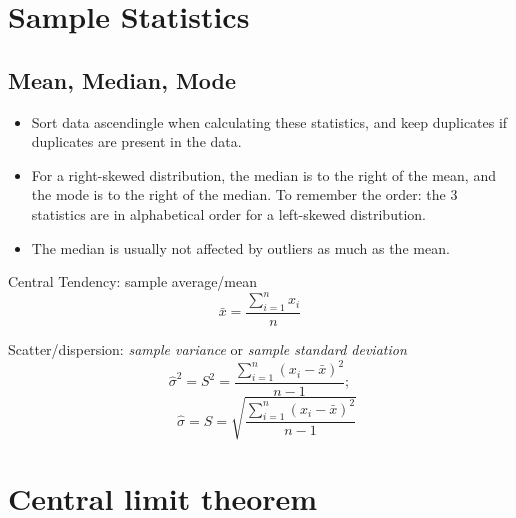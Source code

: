 \documentclass[a4paper,11pt]{book}
\begin{document}
\section*{Sample Statistics}

\subsection*{Mean, Median, Mode}
\begin{itemize}
\item Sort data ascendingle when calculating these statistics, and keep duplicates if duplicates are present in the data.
\item For a right-skewed distribution, the median is to the right of the mean, and the mode is to the right of the median. To remember the order: the 3 statistics are in alphabetical order for a left-skewed distribution.
\item The median is usually not affected by outliers as much as the mean.
\end{itemize}

Central Tendency: sample average/mean 
$$\bar{x}=\frac{\sum\limits_{i=1}^{n} x_i}{n}$$

Scatter/dispersion: \emph{sample variance} or \emph{sample standard deviation}
$$\hat{\sigma}^2=S^2=\frac{\sum\limits_{i=1}^{n}(x_i-\bar{x})^2}{n-1};$$
$$\quad\hat{\sigma}=S=\sqrt{\frac{\sum\limits_{i=1}^{n}(x_i-\bar{x})^2}{n-1}}$$

\section*{Central limit theorem}
\end{document}
